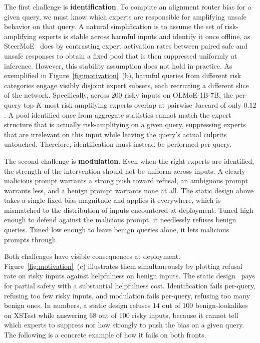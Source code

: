 The first challenge is \textbf{identification}. To compute an alignment router bias for a given query, we must know which experts are responsible for amplifying unsafe behavior on that query. A natural simplification is to assume the set of risk-amplifying experts is stable across harmful inputs and identify it once offline, as SteerMoE~\cite{fayyaz2025steermoe} does by contrasting expert activation rates between paired safe and unsafe responses to obtain a fixed pool that is then suppressed uniformly at inference. However, this stability assumption does not hold in practice. As exemplified in Figure~\ref{fig:motivation}~(b), harmful queries from different risk categories engage visibly disjoint expert subsets, each recruiting a different slice of the network. Specifically, across 200 risky inputs on OLMoE-1B-7B, the per-query top-$K$ most risk-amplifying experts overlap at pairwise Jaccard of only $0.12$. A pool identified once from aggregate statistics cannot match the expert structure that is actually risk-amplifying on a given query, suppressing experts that are irrelevant on this input while leaving the query's actual culprits untouched. Therefore, identification must instead be performed per query.

The second challenge is \textbf{modulation}. Even when the right experts are identified, the strength of the intervention should not be uniform across inputs. A clearly malicious prompt warrants a strong push toward refusal, an ambiguous prompt warrants less, and a benign prompt warrants none at all. The static design above takes a single fixed bias magnitude and applies it everywhere, which is mismatched to the distribution of inputs encountered at deployment. Tuned high enough to defend against the malicious prompt, it needlessly refuses benign queries. Tuned low enough to leave benign queries alone, it lets malicious prompts through.

Both challenges have visible consequences at deployment. Figure~\ref{fig:motivation}~(c) illustrates them simultaneously by plotting refusal rate on risky inputs against helpfulness on benign inputs. The static design~\citep{fayyaz2025steermoe} pays for partial safety with a substantial helpfulness cost. Identification fails per-query, refusing too few risky inputs, and modulation fails per-query, refusing too many benign ones. In numbers, a static design refuses $14$ out of $100$ benign-lookalikes on XSTest while answering $68$ out of $100$ risky inputs, because it cannot tell which experts to suppress nor how strongly to push the bias on a given query. The following is a concrete example of how it fails on both fronts.


